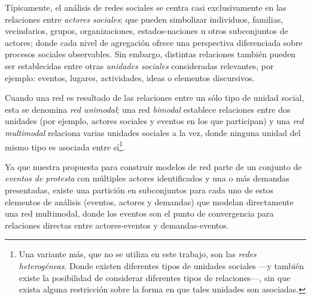 \documentclass[letterpaper, 11pt]{book}
\theoremstyle{definition}
\theoremstyle{remark}
\begin{document}
Típicamente, el análisis de redes sociales se centra casi exclusivamente en las relaciones entre \emph{actores sociales}; que pueden simbolizar individuos, familias, vecindarios, grupos, organizaciones, estados-naciones u otros subconjuntos de actores; donde cada nivel de agregación ofrece una perspectiva diferenciada sobre procesos sociales observables. 
Sin embargo, distintas relaciones también pueden ser establecidas entre otras \emph{unidades sociales} consideradas relevantes, por ejemplo: eventos, lugares, actividades, ideas o elementos discursivos. 

Cuando una red es resultado de las relaciones entre un sólo tipo de unidad social, esta se denomina \emph{red unimodal}; una red \emph{bimodal} establece relaciones entre dos unidades (por ejemplo, actores sociales y eventos en los que participan) y una \emph{red multimodal} relaciona varias unidades sociales a la vez, donde ninguna unidad del mismo tipo es asociada entre sí\footnote{
    Una variante más, que no se utiliza en este trabajo, son las \emph{redes heterogéneas}. 
    Donde existen diferentes tipos de unidades sociales ---y también existe la posibilidad de considerar diferentes tipos de relaciones---, sin que exista alguna restricción sobre la forma en que tales unidades son asociadas.
}. 

Ya que nuestra propuesta para construir modelos de red parte de un conjunto de \emph{eventos de protesta} con múltiples actores identificados y una o más demandas presentadas, existe una partición en subconjuntos para cada uno de estos elementos de análisis (eventos, actores y demandas) que modelan directamente una red multimodal, donde los eventos son el punto de convergencia para relaciones directas entre actores-eventos y demandas-eventos. 
\end{document}

